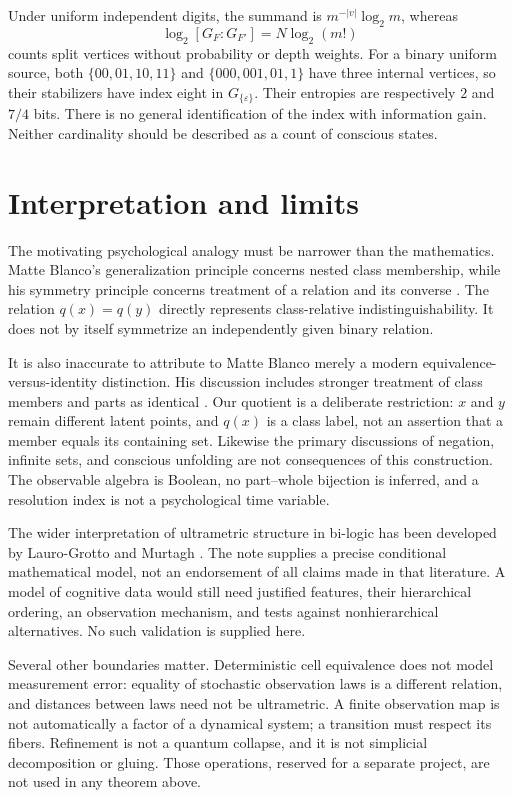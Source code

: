 \documentclass[11pt]{article}
\theoremstyle{definition}
\theoremstyle{remark}
\newcommand{\eps}{\varepsilon}
\begin{document}
Under uniform independent digits, the summand is $m^{-|v|}\log_2m$, whereas
\[
 \log_2[G_F:G_{F'}]=N\log_2(m!)
\]
counts split vertices without probability or depth weights. For a binary uniform source, both $\{00,01,10,11\}$ and $\{000,001,01,1\}$ have three internal vertices, so their stabilizers have index eight in $G_{\{\eps\}}$. Their entropies are respectively $2$ and $7/4$ bits. There is no general identification of the index with information gain. Neither cardinality should be described as a count of conscious states.

\section{Interpretation and limits}\label{sec:limits}
The motivating psychological analogy must be narrower than the mathematics. Matte Blanco's generalization principle concerns nested class membership, while his symmetry principle concerns treatment of a relation and its converse \cite[pp.~38--39]{MatteBlanco1975}. The relation $q(x)=q(y)$ directly represents class-relative indistinguishability. It does not by itself symmetrize an independently given binary relation.

It is also inaccurate to attribute to Matte Blanco merely a modern equivalence-versus-identity distinction. His discussion includes stronger treatment of class members and parts as identical \cite[p.~39]{MatteBlanco1975}. Our quotient is a deliberate restriction: $x$ and $y$ remain different latent points, and $q(x)$ is a class label, not an assertion that a member equals its containing set. Likewise the primary discussions of negation, infinite sets, and conscious unfolding \cite[pp.~45--46, 146--149, 107--108]{MatteBlanco1975} are not consequences of this construction. The observable algebra is Boolean, no part--whole bijection is inferred, and a resolution index is not a psychological time variable.

The wider interpretation of ultrametric structure in bi-logic has been developed by Lauro-Grotto and Murtagh \cite{LauroGrotto2008,Murtagh2012,Murtagh2014}. The note supplies a precise conditional mathematical model, not an endorsement of all claims made in that literature. A model of cognitive data would still need justified features, their hierarchical ordering, an observation mechanism, and tests against nonhierarchical alternatives. No such validation is supplied here.

Several other boundaries matter. Deterministic cell equivalence does not model measurement error: equality of stochastic observation laws is a different relation, and distances between laws need not be ultrametric. A finite observation map is not automatically a factor of a dynamical system; a transition must respect its fibers. Refinement is not a quantum collapse, and it is not simplicial decomposition or gluing. Those operations, reserved for a separate project, are not used in any theorem above.
\end{document}
